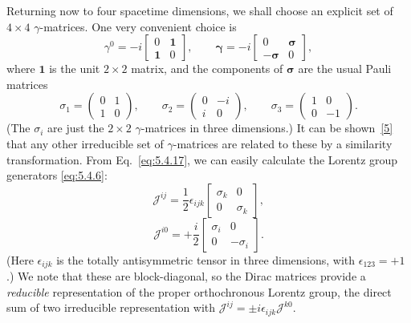 Returning now to four spacetime dimensions, we shall choose an explicit set of
$4\times4$ $\gamma$-matrices. One very convenient choice is
\begin{equation}
\gamma^0=-i\begin{bmatrix}0&\mathbf{1}\\ \mathbf{1}&0\end{bmatrix},
\qquad
\boldsymbol{\gamma}=-i\begin{bmatrix}0&\boldsymbol{\sigma}\\
-\boldsymbol{\sigma}&0\end{bmatrix},
\tag{5.4.17}\label{eq:5.4.17}
\end{equation}
where $\mathbf{1}$ is the unit $2\times2$ matrix, and the components of
$\boldsymbol{\sigma}$ are the usual Pauli matrices
\begin{equation}
\sigma_1=\begin{pmatrix}0&1\\1&0\end{pmatrix},\qquad
\sigma_2=\begin{pmatrix}0&-i\\i&0\end{pmatrix},\qquad
\sigma_3=\begin{pmatrix}1&0\\0&-1\end{pmatrix}.
\tag{5.4.18}\label{eq:5.4.18}
\end{equation}
(The $\sigma_i$ are just the $2\times2$ $\gamma$-matrices in three
dimensions.) It can be shown~\hyperref[ref:5.5]{[5]} that any other irreducible set of
$\gamma$-matrices are related to these by a similarity transformation. From
Eq.~\eqref{eq:5.4.17}, we can easily calculate the Lorentz group generators \eqref{eq:5.4.6}:
\begin{equation}
\mathcal{J}^{ij}=\frac{1}{2}\epsilon_{ijk}
\begin{bmatrix}\sigma_k&0\\0&\sigma_k\end{bmatrix},
\tag{5.4.19}\label{eq:5.4.19}
\end{equation}
\begin{equation}
\mathcal{J}^{i0}=+\frac{i}{2}
\begin{bmatrix}\sigma_i&0\\0&-\sigma_i\end{bmatrix}.
\tag{5.4.20}\label{eq:5.4.20}
\end{equation}
(Here $\epsilon_{ijk}$ is the totally antisymmetric tensor in three dimensions,
with $\epsilon_{123}=+1$.) We note that these are block-diagonal, so the Dirac
matrices provide a \emph{reducible} representation of the proper orthochronous
Lorentz group, the direct sum of two irreducible representation with
$\mathcal{J}^{ij}=\mathbin{\pm}i\epsilon_{ijk}\mathcal{J}^{k0}$.

